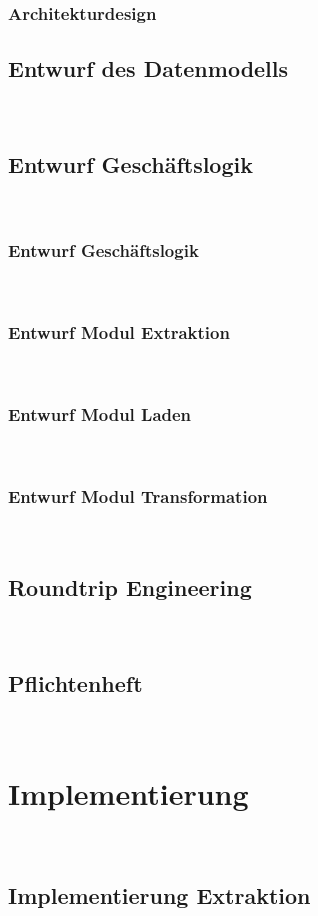 \documentclass[11pt,toc=sectionentrywithoutdots, 
headheight=44pt, headings=optiontoheadandtoc, hyperfootnotes=false, hypertexnames=false]{scrartcl}
\begin{document}
\subsubsection{Architekturdesign}
\blindtext

\subsection{Entwurf des Datenmodells}
\blindtext\

\subsection{Entwurf Geschäftslogik}
\blindtext\

\subsubsection{Entwurf Geschäftslogik}
\blindtext\

\subsubsection{Entwurf Modul Extraktion}
\blindtext\

\subsubsection{Entwurf Modul Laden}
\blindtext\

\subsubsection{Entwurf Modul Transformation}
\blindtext\

\subsection{Roundtrip Engineering}
\blindtext\

\subsection{Pflichtenheft}
\blindtext\

\section{Implementierung}
\blindtext\

\subsection{Implementierung Extraktion}
\blindtext\
\end{document}
